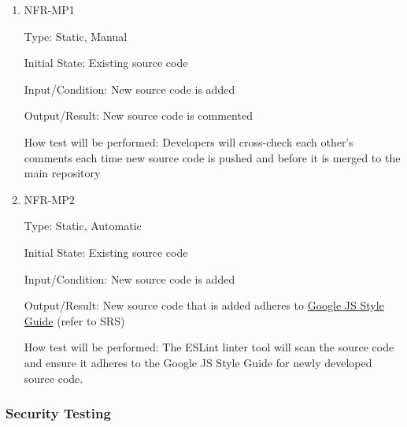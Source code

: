 \documentclass[12pt, titlepage]{article}
\begin{document}
\begin{enumerate}
	
	\item{NFR-MP1\\}
	
	Type: Static, Manual
	
	Initial State: Existing source code
	
	Input/Condition: New source code is added
	
	Output/Result: New source code is commented  
	
	How test will be performed: Developers will cross-check each other's comments each time new source code is pushed and before it is merged to the main repository 
	
	\item{NFR-MP2\\}
	
	Type: Static, Automatic
	
	Initial State: Existing source code
	
	Input/Condition: New source code is added
	
	Output/Result: New source code that is added adheres to \href{https://google.github.io/styleguide/jsguide.html}{\color{red}Google JS Style Guide} (refer to SRS)
	
	How test will be performed: The ESLint linter tool will scan the source code and ensure it adheres to the Google JS Style Guide for newly developed source code.  
	
\end{enumerate}

\subsubsection{Security Testing}
\end{document}
